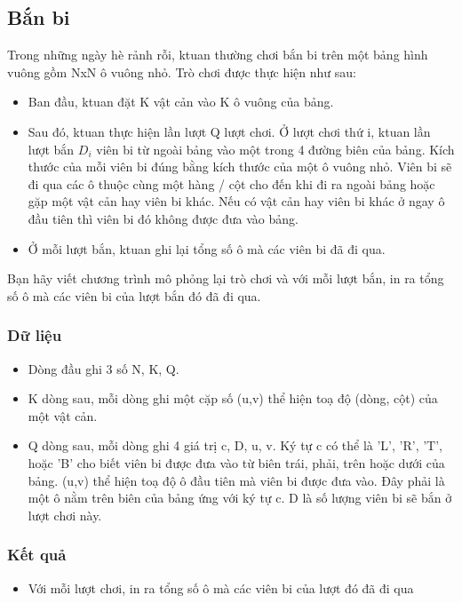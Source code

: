 







\subsection{   Bắn bi  }

   Trong những ngày hè rảnh rỗi, ktuan thường chơi bắn bi trên một bảng hình vuông gồm NxN ô vuông nhỏ. Trò chơi được thực hiện như sau:  
\begin{itemize}
	\item     Ban đầu, ktuan đặt K vật cản vào K ô vuông của bảng.   
	\item     Sau đó, ktuan thực hiện lần lượt Q lượt chơi. Ở lượt chơi thứ i, ktuan lần lượt bắn $D_{i}$    viên bi từ ngoài bảng vào một trong 4 đường biên của bảng. Kích thước của mỗi viên bi đúng bằng kích thước của một ô vuông nhỏ. Viên bi sẽ đi qua các ô thuộc cùng một hàng / cột cho đến khi đi ra ngoài bảng hoặc gặp một vật cản hay viên bi khác. Nếu có vật cản hay viên bi khác ở ngay ô đầu tiên thì viên bi đó không được đưa vào bảng.   
	\item     Ở mỗi lượt bắn, ktuan ghi lại tổng số ô mà các viên bi đã đi qua.   
\end{itemize}

   Bạn hãy viết chương trình mô phỏng lại trò chơi và với mỗi lượt bắn, in ra tổng số ô mà các viên bi của lượt bắn đó đã đi qua.  

\subsubsection{   Dữ liệu  }
\begin{itemize}
	\item     Dòng đầu ghi 3 số N, K, Q.   
	\item     K dòng sau, mỗi dòng ghi một cặp số (u,v) thể hiện toạ độ (dòng, cột) của một vật cản.   
	\item     Q dòng sau, mỗi dòng ghi 4 giá trị c, D, u, v. Ký tự c có thể là 'L', 'R', 'T', hoặc 'B' cho biết viên bi được đưa vào từ biên trái, phải, trên hoặc dưới của bảng. (u,v) thể hiện toạ độ ô đầu tiên mà viên bi được đưa vào. Đây phải là một ô nằm trên biên của bảng ứng với ký tự c. D là số lượng viên bi sẽ bắn ở lượt chơi này.   
\end{itemize}

\subsubsection{   Kết quả  }
\begin{itemize}
	\item     Với mỗi lượt chơi, in ra tổng số ô mà các viên bi của lượt đó đã đi qua   
\end{itemize}

